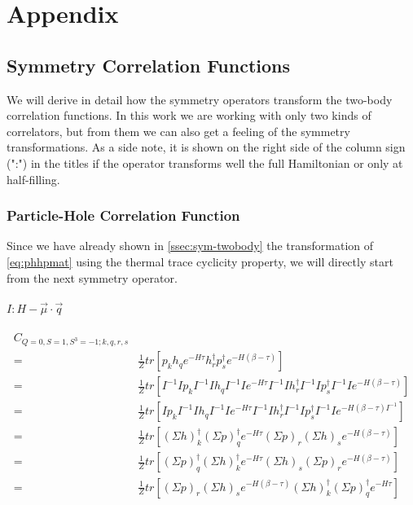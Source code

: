 \chapter{Appendix}
\label{sec:app}

\section{Symmetry Correlation Functions}
We will derive in detail how the symmetry operators transform the two-body correlation functions. In this work we are working with only two kinds of correlators, but from them we can also get a feeling of the symmetry transformations. As a side note, it is shown on the right side of the column sign (":") in the titles if the operator transforms well the full Hamiltonian or only at half-filling.

\subsection{Particle-Hole Correlation Function}

Since we have already shown in \cref{ssec:sym-twobody} the transformation of \cref{eq:phhpmat} using the thermal trace cyclicity property, we will directly start from the next symmetry operator.

\subsubsection{\underline{$I : H - \vec{\mu}\cdot\vec{q}$}}

\begin{equation}
  \begin{aligned}
    C_{Q=0,S=1,S^3=-1;k,q,r,s} \\
    =& \frac{1}{Z}tr\left[p_kh_qe^{-H\tau}h^\dagger_rp^\dagger_se^{-H\left(\beta-\tau\right)}\right] \\
    =& \frac{1}{Z}tr\left[I^{-1}Ip_kI^{-1}Ih_qI^{-1}Ie^{-H\tau}I^{-1}Ih^\dagger_rI^{-1}Ip^\dagger_sI^{-1}Ie^{-H\left(\beta-\tau\right)}\right] \\
    =& \frac{1}{Z}tr\left[Ip_kI^{-1}Ih_qI^{-1}Ie^{-H\tau}I^{-1}Ih^\dagger_rI^{-1}Ip^\dagger_sI^{-1}Ie^{-H\left(\beta-\tau\right)I^{-1}}\right] \\
    =& \frac{1}{Z}tr\left[(\Sigma h)^\dagger_k(\Sigma p)^\dagger_qe^{-H\tau}(\Sigma p)_r(\Sigma h)_se^{-H\left(\beta-\tau\right)}\right] \\
    =& \frac{1}{Z}tr\left[(\Sigma p)^\dagger_q(\Sigma h)^\dagger_ke^{-H\tau}(\Sigma h)_s(\Sigma p)_re^{-H\left(\beta-\tau\right)}\right] \\
    =& \frac{1}{Z}tr\left[(\Sigma p)_r(\Sigma h)_se^{-H\left(\beta-\tau\right)}(\Sigma h)^\dagger_k(\Sigma p)^\dagger_qe^{-H\tau}\right]
  \end{aligned}
\end{equation}

